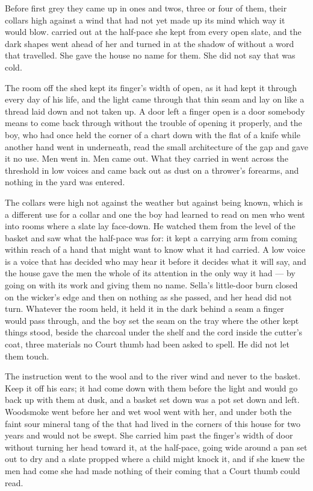 
Before first grey they came up  in ones and twos, three or four of them, their collars high against a wind that had not yet made up its mind which way it would blow.  carried  out at the half-pace she kept from every open slate, and the dark shapes went ahead of her and turned in at the shadow of  without a word that travelled. She gave the house no name for them. She did not say that  was cold.

The room off the shed kept its finger's width of open, as it had kept it through every day of his life, and the light came through that thin seam and lay on  like a thread laid down and not taken up. A door left a finger open is a door somebody means to come back through without the trouble of opening it properly, and the boy, who had once held the corner of a chart down with the flat of a knife while another hand went in underneath, read the small architecture of the gap and gave it no use. Men went in. Men came out. What they carried in went across the threshold in low voices and came back out as dust on a thrower's forearms, and nothing in the yard was entered.

The collars were high not against the weather but against being known, which is a different use for a collar and one the boy had learned to read on men who went into rooms where a slate lay face-down. He watched them from the level of the basket and saw what the half-pace was for: it kept a carrying arm from coming within reach of a hand that might want to know what it had carried. A low voice is a voice that has decided who may hear it before it decides what it will say, and the house gave the men the whole of its attention in the only way it had --- by going on with its work and giving them no name. Sella's little-door burn closed on the wicker's edge and then on nothing as she passed, and her head did not turn. Whatever the room held, it held it in the dark behind a seam a finger would pass through, and the boy set the seam on the tray where the other kept things stood, beside the charcoal under the shelf and the cord inside the cutter's coat, three materials no Court thumb had been asked to spell. He did not let them touch.

The instruction went to the wool and to the river wind and never to the basket. Keep it off his ears; it had come down with them before the light and would go back up with them at dusk, and a basket set down was a pot set down and left. Woodsmoke went before her and wet wool went with her, and under both the faint sour mineral tang of the  that had lived in the corners of this house for two years and would not be swept. She carried him past the finger's width of door without turning her head toward it, at the half-pace, going wide around a pan set out to dry and a slate propped where a child might knock it, and if she knew the men had come she had made nothing of their coming that a Court thumb could read.

